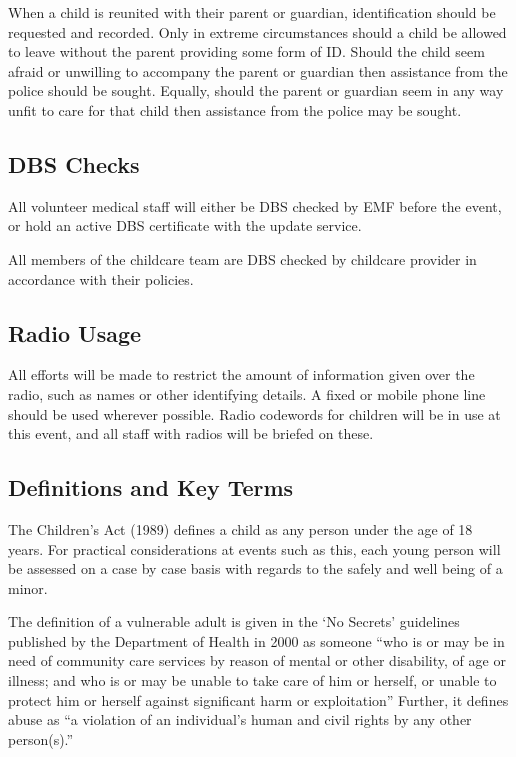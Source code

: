 When a child is reunited with their parent or guardian, identification should be
requested and recorded. Only in extreme circumstances should a child be
allowed to leave without the parent providing some form of ID. Should the child
seem afraid or unwilling to accompany the parent or guardian then assistance
from the police should be sought. Equally, should the parent or guardian
seem in any way unfit to care for that child then assistance from the
police may be sought.

\subsection{DBS Checks}
\label{dbscheck}
All volunteer medical staff will either be DBS checked by EMF before the event,
or hold an active DBS certificate with the update service.

All members of the childcare team are DBS checked by childcare provider in accordance
with their policies.

\subsection{Radio Usage}
All efforts will be made to restrict the amount of information given over the
radio, such as names or other identifying details. A fixed or mobile phone line
should be used wherever possible. Radio codewords for children will be in
use at this event, and all staff with radios will be briefed on these.

\subsection{Definitions and Key Terms}

The Children's Act (1989) defines a child as any person under the age of 18
years. For practical considerations at events such as this, each young person
will be assessed on a case by case basis with regards to the safely and well
being of a minor.

The definition of a vulnerable adult is given in the `No Secrets' guidelines
published by the Department of Health in 2000 as someone ``who is or may be in
need of community care services by reason of mental or other disability, of age
or illness; and who is or may be unable to take care of him or herself, or
unable to protect him or herself against significant harm or exploitation''
Further, it defines abuse as ``a violation of an individual's human and civil
rights by any other person(s).''

